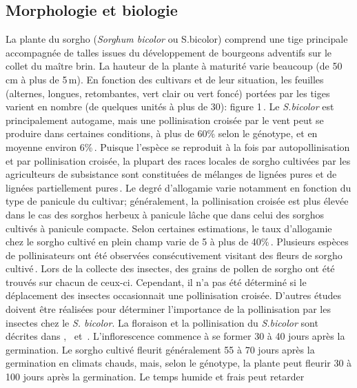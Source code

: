 \documentclass[a4paper,11pt]{article}
\begin{document}
\subsection{Morphologie et biologie} La plante du sorgho
(\emph{Sorghum bicolor} ou S.bicolor) comprend une tige principale
accompagnée de talles issues du développement de bourgeons adventifs
sur le collet du maître brin. La hauteur de la plante à maturité varie
beaucoup (de 50\,cm à plus de 5\,m). En fonction des cultivars et de
leur situation, les feuilles (alternes, longues, retombantes, vert
clair ou vert foncé) portées par les tiges varient en nombre (de
quelques unités à plus de 30): figure
1\,\cite{BARRO_KONDOMBO_2010}. Le \emph{S.bicolor} est principalement
autogame, mais une pollinisation croisée par le vent peut se produire
dans certaines conditions, à plus de 60\% selon le génotype, et en
moyenne environ 6\%\,\cite{Ellstrand_1983,
  House85,Pedersen_1998,Schertz_1980}. Puisque l’espèce se reproduit à
la fois par autopollinisation et par pollinisation croisée, la plupart
des races locales de sorgho cultivées par les agriculteurs de
subsistance sont constituées de mélanges de lignées pures et de
lignées partiellement pures\,\cite{SINGH_1997}. Le degré d’allogamie
varie notamment en fonction du type de panicule du cultivar;
généralement, la pollinisation croisée est plus élevée dans le cas des
sorghos herbeux à panicule lâche que dans celui des sorghos cultivés à
panicule compacte. Selon certaines estimations, le taux d’allogamie
chez le sorgho cultivé en plein champ varie de 5 à plus de
40\%\,\cite{Barnaud_2008, DJE_2004, Doggett_1988,
  Ellstrand_1983,Schmidt_2006}. Plusieurs espèces de pollinisateurs
ont été observées consécutivement visitant des fleurs de sorgho
cultivé\,\cite{Immelman_2000, Schmidt_2006}. Lors de la collecte des
insectes, des grains de pollen de sorgho ont été trouvés sur chacun de
ceux-ci. Cependant, il n’a pas été déterminé si le déplacement des
insectes occasionnait une pollinisation croisée. D’autres études
doivent être réalisées pour déterminer l’importance de la
pollinisation par les insectes chez le \emph{S. bicolor}. La floraison
et la pollinisation du \emph{S.bicolor} sont décrites
dans\,\citeauthor{House85}\,\citeyear{House85},
\citeauthor{SINGH_1997} \,\citeyear{SINGH_1997} et
\citeauthor{SRINIVASA_2013}\,\citeyear{SRINIVASA_2013}. L’inflorescence
commence à se former 30 à 40 jours après la germination. Le sorgho
cultivé fleurit généralement 55 à 70 jours après la germination en
climats chauds, mais, selon le génotype, la plante peut fleurir 30 à
100 jours après la germination. Le temps humide et frais peut retarder
\end{document}
